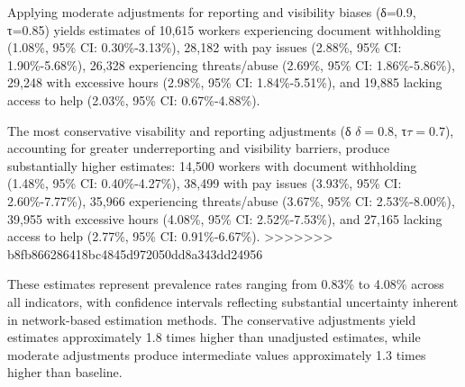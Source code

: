 \documentclass[
  12pt,
  letterpaper,
  DIV=11,
  numbers=noendperiod]{scrartcl}
\theoremstyle{plain}
\theoremstyle{definition}
\begin{document}
Applying moderate adjustments for reporting and visibility biases
(δ=0.9, τ=0.85) yields estimates of 10,615 workers experiencing document
withholding (1.08\%, 95\% CI: 0.30\%-3.13\%), 28,182 with pay issues
(2.88\%, 95\% CI: 1.90\%-5.68\%), 26,328 experiencing threats/abuse
(2.69\%, 95\% CI: 1.86\%-5.86\%), 29,248 with excessive hours (2.98\%,
95\% CI: 1.84\%-5.51\%), and 19,885 lacking access to help (2.03\%, 95\%
CI: 0.67\%-4.88\%).

The most conservative visability and reporting adjustments (δ
\(\delta=0.8\), τ\(\tau=0.7\)), accounting for greater underreporting
and visibility barriers, produce substantially higher estimates: 14,500
workers with document withholding (1.48\%, 95\% CI: 0.40\%-4.27\%),
38,499 with pay issues (3.93\%, 95\% CI: 2.60\%-7.77\%), 35,966
experiencing threats/abuse (3.67\%, 95\% CI: 2.53\%-8.00\%), 39,955 with
excessive hours (4.08\%, 95\% CI: 2.52\%-7.53\%), and 27,165 lacking
access to help (2.77\%, 95\% CI: 0.91\%-6.67\%).
>>>>>>> b8fb866286418bc4845d972050dd8a343dd24956

These estimates represent prevalence rates ranging from 0.83\% to 4.08\%
across all indicators, with confidence intervals reflecting substantial
uncertainty inherent in network-based estimation methods. The
conservative adjustments yield estimates approximately 1.8 times higher
than unadjusted estimates, while moderate adjustments produce
intermediate values approximately 1.3 times higher than baseline.
\end{document}
